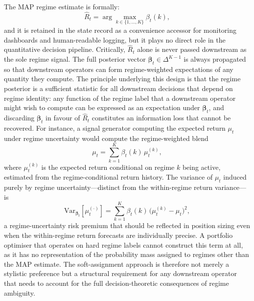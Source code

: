 \documentclass[12pt,openany]{book}
\numberwithin{equation}{chapter}
\theoremstyle{plain}
\theoremstyle{definition}
\theoremstyle{remark}
\begin{document}
The MAP regime estimate is formally:
\begin{equation}
    \hat{R}_t = \arg\max_{k \in \{1,\ldots,K\}} \beta_t(k),
\end{equation}
and it is retained in the state record as a convenience accessor for monitoring dashboards and human-readable logging, but it plays no direct role in the quantitative decision pipeline. Critically, $\hat{R}_t$ alone is never passed downstream as the sole regime signal. The full posterior vector $\boldsymbol{\beta}_t \in \Delta^{K-1}$ is always propagated so that downstream operators can form regime-weighted expectations of any quantity they compute. The principle underlying this design is that the regime posterior is a sufficient statistic for all downstream decisions that depend on regime identity: any function of the regime label that a downstream operator might wish to compute can be expressed as an expectation under $\boldsymbol{\beta}_t$, and discarding $\boldsymbol{\beta}_t$ in favour of $\hat{R}_t$ constitutes an information loss that cannot be recovered. For instance, a signal generator computing the expected return $\mu_t$ under regime uncertainty would compute the regime-weighted blend
\begin{equation}
    \mu_t = \sum_{k=1}^{K} \beta_t(k)\, \mu_t^{(k)},
\end{equation}
where $\mu_t^{(k)}$ is the expected return conditional on regime $k$ being active, estimated from the regime-conditional return history. The variance of $\mu_t$ induced purely by regime uncertainty---distinct from the within-regime return variance---is
\begin{equation}
    \mathrm{Var}_{\boldsymbol{\beta}_t}[\mu_t^{(\cdot)}] = \sum_{k=1}^{K} \beta_t(k)\, \bigl(\mu_t^{(k)} - \mu_t\bigr)^2,
\end{equation}
a regime-uncertainty risk premium that should be reflected in position sizing even when the within-regime return forecasts are individually precise. A portfolio optimiser that operates on hard regime labels cannot construct this term at all, as it has no representation of the probability mass assigned to regimes other than the MAP estimate. The soft-assignment approach is therefore not merely a stylistic preference but a structural requirement for any downstream operator that needs to account for the full decision-theoretic consequences of regime ambiguity.
\end{document}
